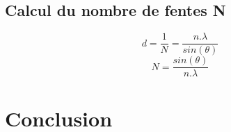 \documentclass[11pt,a4paper]{report}
\begin{document}
	\subsection{Calcul du nombre de fentes N}
	\begin{equation}
	d = \frac{1}{N} = \frac{n.\lambda}{sin(\theta)}
	\end{equation}
	\begin{equation}
	N =  \frac{sin(\theta)}{n.\lambda}
	\end{equation}

	\section{Conclusion}
\end{document}
